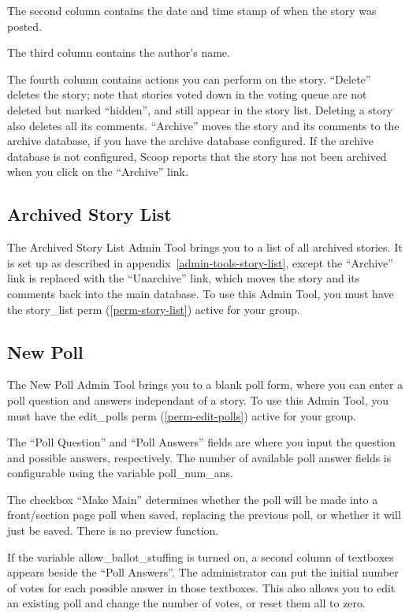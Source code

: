 The second column contains the date and time stamp of when the story was posted.

The third column contains the author's name.

The fourth column contains actions you can perform on the story.  ``Delete'' deletes the story; note that stories voted down in the voting queue are not deleted but marked ``hidden'', and still appear in the story list.  Deleting a story also deletes all its comments.  ``Archive'' moves the story and its comments to the archive database, if you have the archive database configured.  If the archive database is not configured, Scoop reports that the story has not been archived when you click on the ``Archive'' link.

\subsection{Archived Story List}
\label{admin-tools-archived-story-list}

The Archived Story List Admin Tool brings you to a list of all archived stories.  It is set up as described in appendix~\ref{admin-tools-story-list}, except the ``Archive'' link is replaced with the ``Unarchive'' link, which moves the story and its comments back into the main database.  To use this Admin Tool, you must have the story\_list perm (\ref{perm-story-list}) active for your group.

\subsection{New Poll}
\label{admin-tools-new-poll}

The New Poll Admin Tool brings you to a blank poll form, where you can enter a poll question and answers independant of a story.  To use this Admin Tool, you must have the edit\_polls perm (\ref{perm-edit-polls}) active for your group.

The ``Poll Question'' and ``Poll Answers'' fields are where you input the question and possible answers, respectively.  The number of available poll answer fields is configurable using the variable poll\_num\_ans.

The checkbox ``Make Main'' determines whether the poll will be made into a front/section page poll when saved, replacing the previous poll, or whether it will just be saved.  There is no preview function.

If the variable allow\_ballot\_stuffing is turned on, a second column of textboxes appears beside the ``Poll Answers''.  The administrator can put the initial number of votes for each possible answer in those textboxes.  This also allows you to edit an existing poll and change the number of votes, or reset them all to zero.

